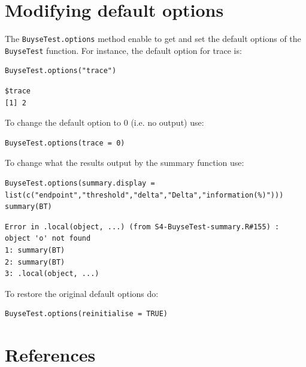 \documentclass[12pt]{article}
\begin{document}
\section{Modifying default options}
\label{sec:org3593041}
The \texttt{BuyseTest.options} method enable to get and set the default
options of the \texttt{BuyseTest} function. For instance, the default option
for trace is:
\lstset{language=r,label= ,caption= ,captionpos=b,numbers=none}
\begin{lstlisting}
BuyseTest.options("trace")
\end{lstlisting}

\begin{verbatim}
$trace
[1] 2
\end{verbatim}


To change the default option to 0 (i.e. no output) use:
\lstset{language=r,label= ,caption= ,captionpos=b,numbers=none}
\begin{lstlisting}
BuyseTest.options(trace = 0)
\end{lstlisting}

To change what the results output by the summary function use:
\lstset{language=r,label= ,caption= ,captionpos=b,numbers=none}
\begin{lstlisting}
BuyseTest.options(summary.display = list(c("endpoint","threshold","delta","Delta","information(%)")))
summary(BT)
\end{lstlisting}

\begin{verbatim}
Error in .local(object, ...) (from S4-BuyseTest-summary.R#155) : object 'o' not found
1: summary(BT)
2: summary(BT)
3: .local(object, ...)
\end{verbatim}



To restore the original default options do:
\lstset{language=r,label= ,caption= ,captionpos=b,numbers=none}
\begin{lstlisting}
BuyseTest.options(reinitialise = TRUE)
\end{lstlisting}

\clearpage

\section*{References}
\label{sec:org40812a2}
\begingroup
\renewcommand{\section}[2]{}




\endgroup
\end{document}
